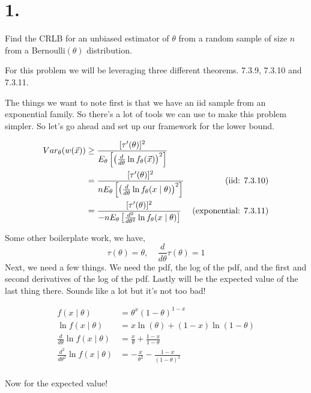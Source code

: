 \section*{1.}

Find the CRLB for an unbiased estimator of $\theta$ from a random sample of size $n$ from a Bernoulli$(\theta)$ distribution.

For this problem we will be leveraging three different theorems. 7.3.9, 7.3.10 and 7.3.11. 

The things we want to note first is that we have an iid sample from an exponential family. So there's a lot of tools we can use to make this problem simpler. So let's go ahead and set up our framework for the lower bound.

\begin{align*}
	Var_{\theta}(w(\vec{x})) &\geq \frac{[\tau'(\theta)]^2}{E_{\theta}\left[ \left( \frac{d}{d\theta} \ln f_{\theta}(\vec{x}) \right)^2 \right]} \\
	&= \frac{[\tau'(\theta)]^2}{n E_{\theta}\left[ \left( \frac{d}{d\theta} \ln f_{\theta}(x \mid \theta) \right)^2 \right]} & \text{(iid: 7.3.10)} \\
	&= \frac{[\tau'(\theta)]^2}{-n E_{\theta}\left[ \frac{d^2}{d\theta^2} \ln f_{\theta}(x \mid \theta) \right]} & \text{(exponential: 7.3.11)}
\end{align*}

Some other boilerplate work, we have,
\[
	\tau(\theta) = \theta, \;\;\;\;
	\frac{d}{d\theta} \tau(\theta) = 1
\]
Next, we need a few things. We need the pdf, the log of the pdf, and the first and second derivatives of the log of the pdf. Lastly will be the expected value of the last thing there. Sounds like a lot but it's not too bad!

\begin{align*}
	f(x \mid \theta) &= \theta^x(1- \theta)^{1 - x} \\
	\ln f(x \mid \theta) &= x \ln(\theta) + (1-x) \ln(1-\theta) \\
	\frac{d}{d\theta} \ln f(x \mid \theta) &= \frac{x}{\theta} + \frac{1-x}{1-\theta} \\
	\frac{d^2}{d\theta^2} \ln f(x \mid \theta) &= -\frac{x}{\theta^2} - \frac{1-x}{(1-\theta)^2} \\
\end{align*}

Now for the expected value!


